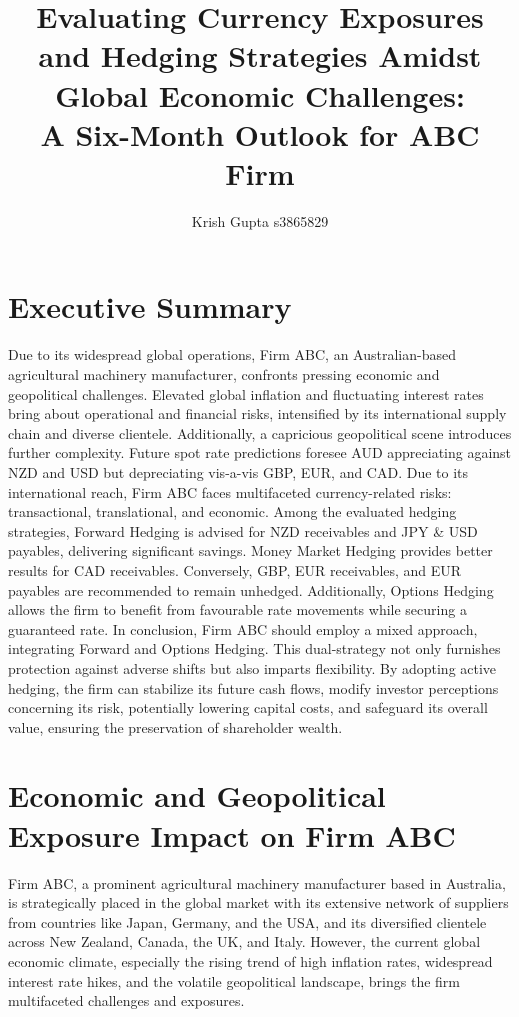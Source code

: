 \documentclass{article}
\title{Evaluating Currency Exposures and Hedging Strategies Amidst Global Economic Challenges:\\
A Six-Month Outlook for ABC Firm}
\author{Krish Gupta s3865829}
\begin{document}
\maketitle

\tableofcontents
\pagebreak

\section*{Executive Summary}
Due to its widespread global operations, Firm ABC, an Australian-based agricultural machinery manufacturer, confronts pressing economic and geopolitical challenges. Elevated global inflation and fluctuating interest rates bring about operational and financial risks, intensified by its international supply chain and diverse clientele. Additionally, a capricious geopolitical scene introduces further complexity. Future spot rate predictions foresee AUD appreciating against NZD and USD but depreciating vis-a-vis GBP, EUR, and CAD. Due to its international reach, Firm ABC faces multifaceted currency-related risks: transactional, translational, and economic. Among the evaluated hedging strategies, Forward Hedging is advised for NZD receivables and JPY \& USD payables, delivering significant savings. Money Market Hedging provides better results for CAD receivables.
Conversely, GBP, EUR receivables, and EUR payables are recommended to remain unhedged. Additionally, Options Hedging allows the firm to benefit from favourable rate movements while securing a guaranteed rate. In conclusion, Firm ABC should employ a mixed approach, integrating Forward and Options Hedging. This dual-strategy not only furnishes protection against adverse shifts but also imparts flexibility. By adopting active hedging, the firm can stabilize its future cash flows, modify investor perceptions concerning its risk, potentially lowering capital costs, and safeguard its overall value, ensuring the preservation of shareholder wealth.\\

\section*{Economic and Geopolitical Exposure Impact on Firm ABC}
Firm ABC, a prominent agricultural machinery manufacturer based in Australia, is strategically placed in the global market with its extensive network of suppliers from countries like Japan, Germany, and the USA, and its diversified clientele across New Zealand, Canada, the UK, and Italy. However, the current global economic climate, especially the rising trend of high inflation rates, widespread interest rate hikes, and the volatile geopolitical landscape, brings the firm multifaceted challenges and exposures.\\
\end{document}
